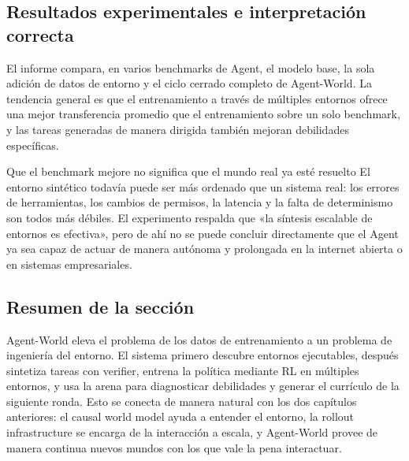 \subsection{Resultados experimentales e interpretación correcta}

El informe compara, en varios benchmarks de Agent, el modelo base, la sola adición de datos de entorno y el ciclo cerrado completo de Agent-World. La tendencia general es que el entrenamiento a través de múltiples entornos ofrece una mejor transferencia promedio que el entrenamiento sobre un solo benchmark, y las tareas generadas de manera dirigida también mejoran debilidades específicas.




\begin{warningbox}{Que el benchmark mejore no significa que el mundo real ya esté resuelto}
El entorno sintético todavía puede ser más ordenado que un sistema real: los errores de herramientas, los cambios de permisos, la latencia y la falta de determinismo son todos más débiles. El experimento respalda que «la síntesis escalable de entornos es efectiva», pero de ahí no se puede concluir directamente que el Agent ya sea capaz de actuar de manera autónoma y prolongada en la internet abierta o en sistemas empresariales.
\end{warningbox}

\subsection{Resumen de la sección}

Agent-World eleva el problema de los datos de entrenamiento a un problema de ingeniería del entorno. El sistema primero descubre entornos ejecutables, después sintetiza tareas con verifier, entrena la política mediante RL en múltiples entornos, y usa la arena para diagnosticar debilidades y generar el currículo de la siguiente ronda. Esto se conecta de manera natural con los dos capítulos anteriores: el causal world model ayuda a entender el entorno, la rollout infrastructure se encarga de la interacción a escala, y Agent-World provee de manera continua nuevos mundos con los que vale la pena interactuar.
